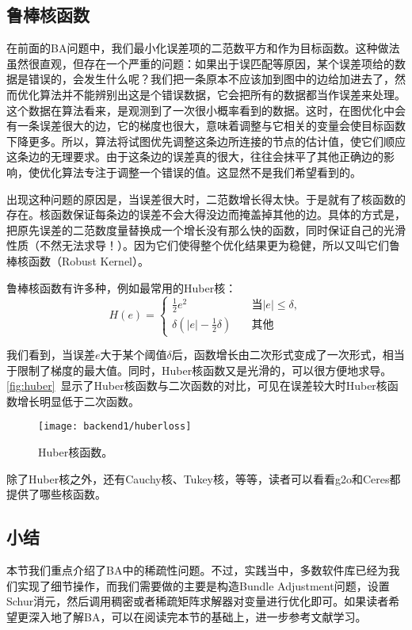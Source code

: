 \subsection{鲁棒核函数}
在前面的BA问题中，我们最小化误差项的二范数平方和作为目标函数。这种做法虽然很直观，但存在一个严重的问题：如果出于误匹配等原因，某个误差项给的数据是错误的，会发生什么呢？我们把一条原本不应该加到图中的边给加进去了，然而优化算法并不能辨别出这是个错误数据，它会把所有的数据都当作误差来处理。这个数据在算法看来，是观测到了一次很小概率看到的数据。这时，在图优化中会有一条误差很大的边，它的梯度也很大，意味着调整与它相关的变量会使目标函数下降更多。所以，算法将试图优先调整这条边所连接的节点的估计值，使它们顺应这条边的无理要求。由于这条边的误差真的很大，往往会抹平了其他正确边的影响，使优化算法专注于调整一个错误的值。这显然不是我们希望看到的。

出现这种问题的原因是，当误差很大时，二范数增长得太快。于是就有了核函数的存在。核函数保证每条边的误差不会大得没边而掩盖掉其他的边。具体的方式是，把原先误差的二范数度量替换成一个增长没有那么快的函数，同时保证自己的光滑性质（不然无法求导！）。因为它们使得整个优化结果更为稳健，所以又叫它们鲁棒核函数（Robust Kernel）。

鲁棒核函数有许多种，例如最常用的Huber核：
\begin{equation}
H\left( e \right) = 
\left\{ 
\begin{array}{ll}
\frac{1}{2}{e^2} &\quad \text{当} |e| \leqslant \delta, \\
\delta \left( {\left| e \right| - \frac{1}{2}\delta } \right) &\quad \text{其他}
\end{array} \right.
\end{equation}

我们看到，当误差$e$大于某个阈值$\delta$后，函数增长由二次形式变成了一次形式，相当于限制了梯度的最大值。同时，Huber核函数又是光滑的，可以很方便地求导。\autoref{fig:huber}~显示了Huber核函数与二次函数的对比，可见在误差较大时Huber核函数增长明显低于二次函数。

\begin{figure}[!htp]
	\centering
	\texttt{[image: backend1/huberloss]}
	\caption{Huber核函数。}
	\label{fig:huber}
\end{figure}

除了Huber核之外，还有Cauchy核、Tukey核，等等，读者可以看看g2o和Ceres都提供了哪些核函数。

\subsection{小结}
本节我们重点介绍了BA中的稀疏性问题。不过，实践当中，多数软件库已经为我们实现了细节操作，而我们需要做的主要是构造Bundle Adjustment问题，设置Schur消元，然后调用稠密或者稀疏矩阵求解器对变量进行优化即可。如果读者希望更深入地了解BA，可以在阅读完本节的基础上，进一步参考文献\cite{Triggs2000}学习。

